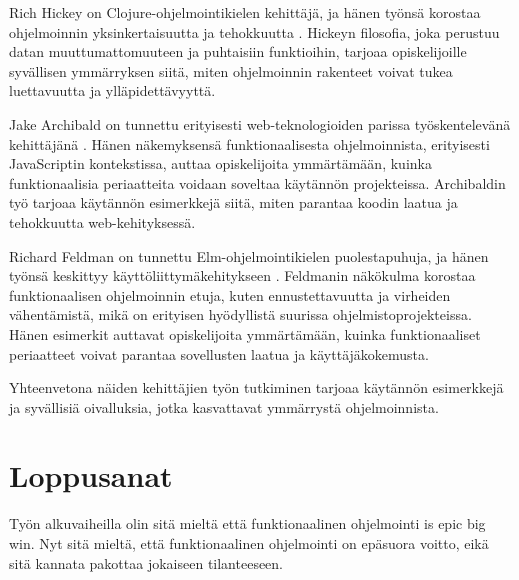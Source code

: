 Rich Hickey on Clojure-ohjelmointikielen kehittäjä, ja hänen työnsä korostaa ohjelmoinnin yksinkertaisuutta ja tehokkuutta \cite{hickey_maybe_not,hickey_persistent_2009}. Hickeyn filosofia, joka perustuu datan muuttumattomuuteen ja puhtaisiin funktioihin, tarjoaa opiskelijoille syvällisen ymmärryksen siitä, miten ohjelmoinnin rakenteet voivat tukea luettavuutta ja ylläpidettävyyttä.

Jake Archibald on tunnettu erityisesti web-teknologioiden parissa työskentelevänä kehittäjänä \cite{against_self_closing_tags,is_reduce_bad}. Hänen näkemyksensä funktionaalisesta ohjelmoinnista, erityisesti JavaScriptin kontekstissa, auttaa opiskelijoita ymmärtämään, kuinka funktionaalisia periaatteita voidaan soveltaa käytännön projekteissa. Archibaldin työ tarjoaa käytännön esimerkkejä siitä, miten parantaa koodin laatua ja tehokkuutta web-kehityksessä.

Richard Feldman on tunnettu Elm-ohjelmointikielen puolestapuhuja, ja hänen työnsä keskittyy käyttöliittymäkehitykseen \cite{feldman_fp_pragmatists,impossiblebetter}. Feldmanin näkökulma korostaa funktionaalisen ohjelmoinnin etuja, kuten ennustettavuutta ja virheiden vähentämistä, mikä on erityisen hyödyllistä suurissa ohjelmistoprojekteissa. Hänen esimerkit auttavat opiskelijoita ymmärtämään, kuinka funktionaaliset periaatteet voivat parantaa sovellusten laatua ja käyttäjäkokemusta.

Yhteenvetona näiden kehittäjien työn tutkiminen tarjoaa käytännön esimerkkejä ja syvällisiä oivalluksia, jotka kasvattavat ymmärrystä  ohjelmoinnista.

\section{Loppusanat}

Työn alkuvaiheilla olin sitä mieltä että funktionaalinen ohjelmointi is epic big win. Nyt sitä mieltä, että funktionaalinen ohjelmointi on epäsuora voitto, eikä sitä kannata pakottaa jokaiseen tilanteeseen.